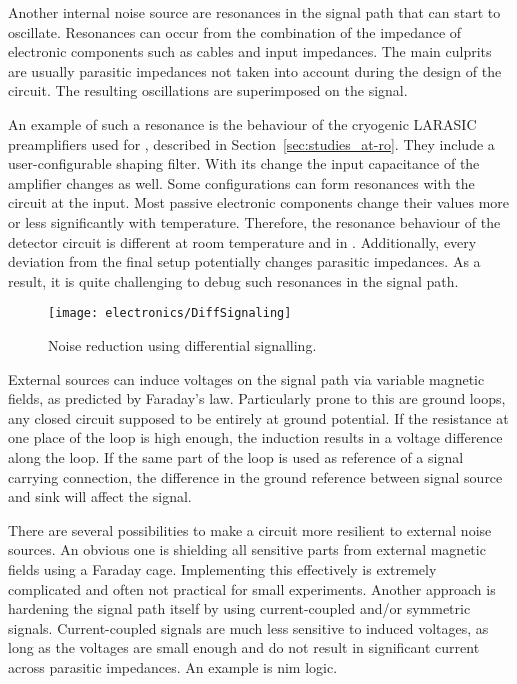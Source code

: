 Another internal noise source are resonances in the signal path that can start to oscillate.
Resonances can occur from the combination of the impedance of electronic components such as cables and input impedances.
The main culprits are usually parasitic impedances not taken into account during the design of the circuit.
The resulting oscillations are superimposed on the signal.

An example of such a resonance is the behaviour of the cryogenic LARASIC preamplifiers used for \AT{}, described in Section~\ref{sec:studies_at-ro}.
They include a user-configurable shaping filter.
With its change the input capacitance of the amplifier changes as well.
Some configurations can form resonances with the circuit at the input.
Most passive electronic components change their values more or less significantly with temperature.
Therefore, the resonance behaviour of the detector circuit is different at room temperature and in \lar{}.
Additionally, every deviation from the final setup potentially changes parasitic impedances.
As a result, it is quite challenging to debug such resonances in the signal path.

\begin{figure}[tbp]
	\centering
	\texttt{[image: electronics/DiffSignaling]}
	\caption[Differential signalling]{%
		Noise reduction using differential signalling.~\cite{diff_signal}
	}
	\label{fig:electronics_diff-signal}
\end{figure}

External sources can induce voltages on the signal path via variable magnetic fields, as predicted by Faraday's law.
Particularly prone to this are ground loops, any closed circuit supposed to be entirely at ground potential.
If the resistance at one place of the loop is high enough, the induction results in a voltage difference along the loop.
If the same part of the loop is used as reference of a signal carrying connection, the difference in the ground reference between signal source and sink will affect the signal.

There are several possibilities to make a circuit more resilient to external noise sources.
An obvious one is shielding all sensitive parts from external magnetic fields using a Faraday cage.
Implementing this effectively is extremely complicated and often not practical for small experiments.
Another approach is hardening the signal path itself by using current-coupled and/or symmetric signals.
Current-coupled signals are much less sensitive to induced voltages, as long as the voltages are small enough and do not result in significant current across parasitic impedances.
An example is \gls{nim} logic.

